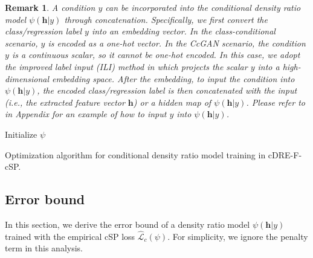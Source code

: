 \documentclass[final,12pt, 3p,times]{elsarticle}
\newtheorem{remark}{Remark}
\begin{document}
\begin{remark}\label{rmk:how_to_input_condition}
    A condition $y$ can be incorporated into the conditional density ratio model $\psi(\bm{h}|y)$ through concatenation. Specifically, we first convert the class/regression label $y$ into an embedding vector. In the class-conditional scenario, $y$ is encoded as a one-hot vector. In the CcGAN scenario, the condition $y$ is a continuous scalar, so it cannot be one-hot encoded. In this case, we adopt the \textit{improved label input} (ILI) method in \cite{ding2020continuous} which projects the scalar $y$ into a high-dimensional embedding space. After the embedding, to input the condition into $\psi(\bm{h}|y)$, the encoded class/regression label is then concatenated with the input (i.e., the extracted feature vector $\boldsymbol{h}$) or a hidden map of $\psi(\bm{h}|y)$. Please refer to  in Appendix for an example of how to input $y$ into $\psi(\bm{h}|y)$.
\end{remark}


\begin{algorithm}[t] \footnotesize
	\SetAlgoLined
	Initialize $\psi$\;
	\caption{Optimization algorithm for conditional density ratio model training in cDRE-F-cSP.}
	\label{alg:cDRE-F-cSP}
\end{algorithm}



\subsection{Error bound}\label{sec:cDRE_error_bound}
In this section, we derive the error bound of a density ratio model $\psi(\bm{h}|y)$ trained with the empirical cSP loss $\widehat{\mathcal{L}}_c(\psi)$. For simplicity, we ignore the penalty term in this analysis. 
\end{document}
